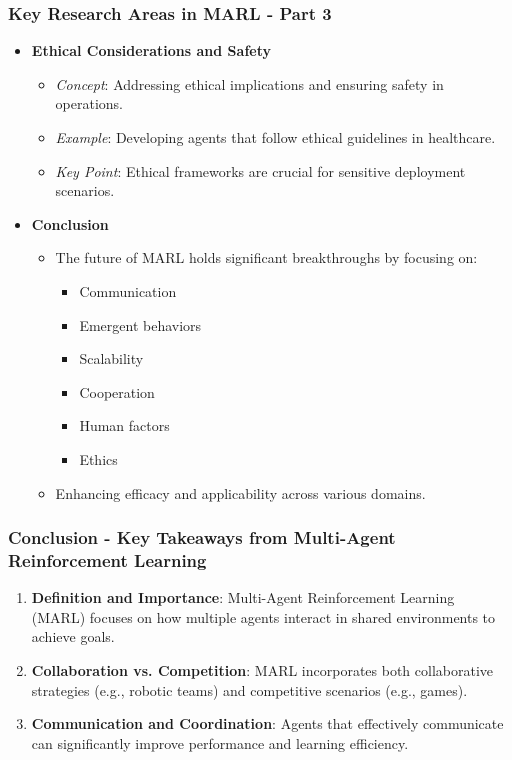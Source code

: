 \documentclass[aspectratio=169]{beamer}
\begin{document}
\begin{frame}[fragile]
  \frametitle{Key Research Areas in MARL - Part 3}
  \begin{itemize}
    \item \textbf{Ethical Considerations and Safety}
      \begin{itemize}
        \item \textit{Concept}: Addressing ethical implications and ensuring safety in operations.
        \item \textit{Example}: Developing agents that follow ethical guidelines in healthcare.
        \item \textit{Key Point}: Ethical frameworks are crucial for sensitive deployment scenarios.
      \end{itemize}
    
    \item \textbf{Conclusion}
      \begin{itemize}
        \item The future of MARL holds significant breakthroughs by focusing on:
        \begin{itemize}
          \item Communication
          \item Emergent behaviors
          \item Scalability
          \item Cooperation
          \item Human factors
          \item Ethics
        \end{itemize}
        \item Enhancing efficacy and applicability across various domains.
      \end{itemize}
  \end{itemize}
\end{frame}

\begin{frame}[fragile]
    \frametitle{Conclusion - Key Takeaways from Multi-Agent Reinforcement Learning}
    \begin{enumerate}
        \item \textbf{Definition and Importance}:
        Multi-Agent Reinforcement Learning (MARL) focuses on how multiple agents interact in shared environments to achieve goals.
        
        \item \textbf{Collaboration vs. Competition}:
        MARL incorporates both collaborative strategies (e.g., robotic teams) and competitive scenarios (e.g., games).
        
        \item \textbf{Communication and Coordination}:
        Agents that effectively communicate can significantly improve performance and learning efficiency.
    \end{enumerate}
\end{frame}
\end{document}
